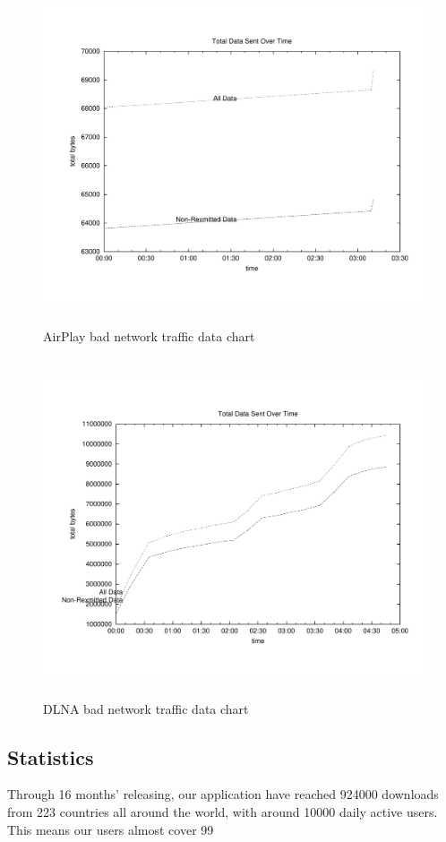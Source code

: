 \begin{figure}[htb]
\centering \includegraphics[height=10cm]{charts/AirPlay_traffic_15loss_data}
\caption{AirPlay bad network traffic data chart \label{chart6}}
\end{figure}
\begin{figure}[htb]
\centering \includegraphics[height=10cm]{charts/dlna_traffic_15loss_data}
\caption{DLNA bad network traffic data chart \label{chart6}}
\end{figure}

\subsection{Statistics}
Through 16 months' releasing, our application have reached 924000 downloads from 223 countries all around the world, with around 10000 daily active users. This means our users almost cover 99%


